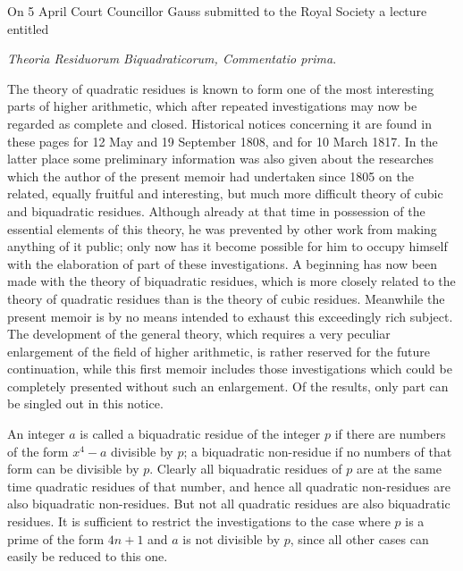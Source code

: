 \documentclass[12pt]{article}
\begin{document}
On 5 April Court Councillor Gauss submitted to the Royal Society a lecture entitled
\begin{center}\textit{Theoria Residuorum Biquadraticorum, Commentatio prima}.\end{center}
The theory of quadratic residues is known to form one of the most interesting parts of higher arithmetic, which after repeated investigations may now be regarded as complete and closed. Historical notices concerning it are found in these pages for 12 May and 19 September 1808, and for 10 March 1817. In the latter place some preliminary information was also given about the researches which the author of the present memoir had undertaken since 1805 on the related, equally fruitful and interesting, but much more difficult theory of cubic and biquadratic residues. Although already at that time in possession of the essential elements of this theory, he was prevented by other work from making anything of it public; only now has it become possible for him to occupy himself with the elaboration of part of these investigations. A beginning has now been made with the theory of biquadratic residues, which is more closely related to the theory of quadratic residues than is the theory of cubic residues. Meanwhile the present memoir is by no means intended to exhaust this exceedingly rich subject. The development of the general theory, which requires a very peculiar enlargement of the field of higher arithmetic, is rather reserved for the future continuation, while this first memoir includes those investigations which could be completely presented without such an enlargement. Of the results, only part can be singled out in this notice.

An integer $a$ is called a biquadratic residue of the integer $p$ if there are numbers of the form $x^4-a$ divisible by $p$; a biquadratic non-residue if no numbers of that form can be divisible by $p$. Clearly all biquadratic residues of $p$ are at the same time quadratic residues of that number, and hence all quadratic non-residues are also biquadratic non-residues. But not all quadratic residues are also biquadratic residues. It is sufficient to restrict the investigations to the case where $p$ is a prime of the form $4n+1$ and $a$ is not divisible by $p$, since all other cases can easily be reduced to this one.
\end{document}
